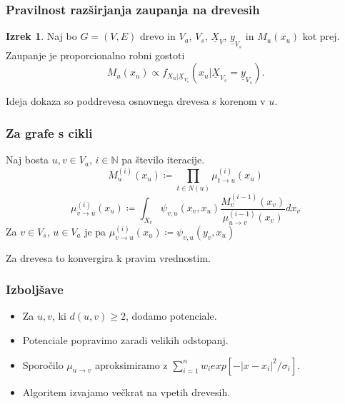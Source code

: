 \documentclass[notes]{beamer}
\renewcommand{\vec}{\underline}
\theoremstyle{definition}
\newtheorem{izrek}{Izrek}
\begin{document}
  \begin{frame}
    \frametitle{Pravilnost razširjanja zaupanja na drevesih}
    \begin{izrek}
      Naj bo $G = \left(V, E\right)$ drevo in $V_a$, $V_s$, $\vec{X}_V$,
      $\vec{y}_{V_s}$ in $M_u\left(x_u\right)$ kot prej.
      Zaupanje je proporcionalno robni gostoti
      $$
      M_u\left(x_u\right) \propto f_{X_u | \vec{X}_{V_s}}\left(x_u | \vec{X}_{V_s} = \vec{y}_{V_s}\right).
      $$
    \end{izrek}
    Ideja dokaza so poddrevesa osnovnega drevesa s korenom v $u$.
  \end{frame}


  \begin{frame}
    \frametitle{Za grafe s cikli}
    Naj bosta $u,v \in V_a$, $i \in \mathbb{N}$ pa število iteracije.
    $$
    M_u^{\left(i\right)}\left(x_u\right) \coloneqq
    \prod_{t \in N\left(u\right)}\mu^{\left(i\right)}_{t \to u}\left(x_u\right)
    $$
    $$
    \mu_{v \to u}^{\left(i\right)}\left(x_u\right) \coloneqq
    \int_{X_v} \psi_{v,u}\left(x_v,x_u\right)
    \frac{
      M_v^{\left(i-1\right)}\left(x_v\right)}{
      \mu_{u \to v}^{\left(i-1\right)}\left(x_v\right)
    }dx_v
    $$
    Za $v \in V_s$, $u \in V_a$ je pa
    $\mu_{v \to u}^{\left(i\right)}\left(x_u\right) \coloneqq \psi_{v,u}\left(y_v, x_u\right)$

    Za drevesa to konvergira k pravim vrednostim.
  \end{frame}


  \begin{frame}
    \frametitle{Izboljšave}
    \begin{itemize}
      \item Za $u,v$, ki $d\left(u,v\right) \geq 2$, dodamo potenciale.
      \item Potenciale popravimo zaradi velikih odstopanj.
      \item Sporočilo $\mu_{u \to v}$ aproksimiramo z
        $\sum_{i=1}^{n}w_i exp\left[-\left|x-x_i\right|^2/\sigma_i\right]$.
      \item Algoritem izvajamo večkrat na vpetih drevesih.
    \end{itemize}
  \end{frame}
\end{document}
